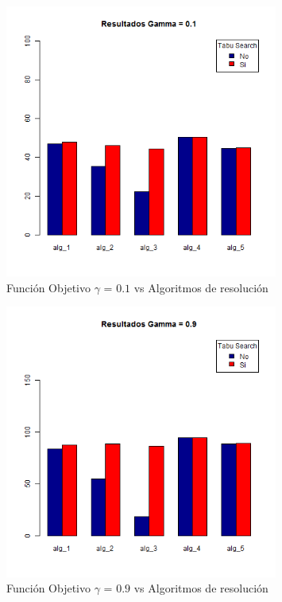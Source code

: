 \begin{figure}[H]
  \centering
    \includegraphics[width=0.8\textwidth]{resultados/authors/Graficos_agrupados/gamma01-autores.png}
  \caption{Función Objetivo $\gamma$ = $0.1$ vs Algoritmos de resolución}
  \label{res:img-autores-agr-gamma01}
\end{figure}

\begin{figure}[H]
  \centering
    \includegraphics[width=0.8\textwidth]{resultados/authors/Graficos_agrupados/gamma09-autores.png}
  \caption{Función Objetivo $\gamma$ = $0.9$ vs Algoritmos de resolución}
  \label{res:img-autores-agr-gamma09}
\end{figure}

